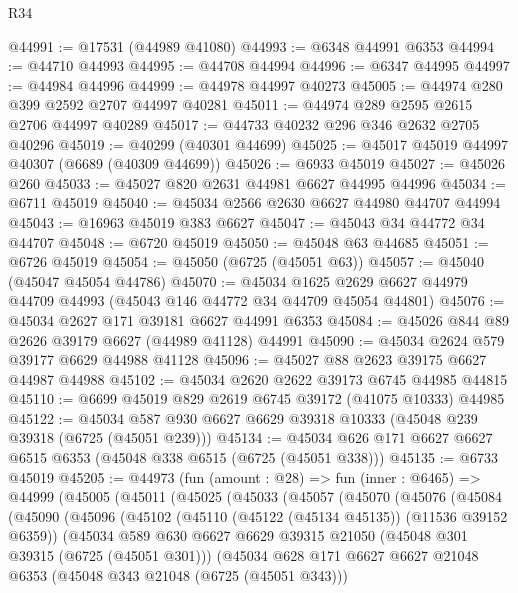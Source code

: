 \begin{lexlean}{R34}
\begin{coremodule}
@44991 := @17531 (@44989 @41080)
@44993 := @6348 @44991 @6353
@44994 := @44710 @44993
@44995 := @44708 @44994
@44996 := @6347 @44995
@44997 := @44984 @44996
@44999 := @44978 @44997 @40273
@45005 := @44974 @280 @399 @2592 @2707 @44997 @40281
@45011 := @44974 @289 @2595 @2615 @2706 @44997 @40289
@45017 := @44733 @40232 @296 @346 @2632 @2705 @40296
@45019 := @40299 (@40301 @44699)
@45025 := @45017 @45019 @44997 @40307 (@6689 (@40309 @44699))
@45026 := @6933 @45019
@45027 := @45026 @260
@45033 := @45027 @820 @2631 @44981 @6627 @44995 @44996
@45034 := @6711 @45019
@45040 := @45034 @2566 @2630 @6627 @44980 @44707 @44994
@45043 := @16963 @45019 @383 @6627
@45047 := @45043 @34 @44772 @34 @44707
@45048 := @6720 @45019
@45050 := @45048 @63 @44685
@45051 := @6726 @45019
@45054 := @45050 (@6725 (@45051 @63))
@45057 := @45040 (@45047 @45054 @44786)
@45070 := @45034
    @1625
    @2629
    @6627
    @44979
    @44709
    @44993
    (@45043 @146 @44772 @34 @44709 @45054 @44801)
@45076 := @45034 @2627 @171 @39181 @6627 @44991 @6353
@45084 := @45026 @844 @89 @2626 @39179 @6627 (@44989 @41128) @44991
@45090 := @45034 @2624 @579 @39177 @6629 @44988 @41128
@45096 := @45027 @88 @2623 @39175 @6627 @44987 @44988
@45102 := @45034 @2620 @2622 @39173 @6745 @44985 @44815
@45110 := @6699 @45019 @829 @2619 @6745 @39172 (@41075 @10333) @44985
@45122 := @45034 @587 @930 @6627 @6629 @39318 @10333 (@45048 @239 @39318 (@6725 (@45051 @239)))
@45134 := @45034 @626 @171 @6627 @6627 @6515 @6353 (@45048 @338 @6515 (@6725 (@45051 @338)))
@45135 := @6733 @45019
@45205 := @44973
    (fun (amount : @28) =>
    fun (inner : @6465) =>
    @44999
      (@45005
        (@45011
          (@45025
            (@45033
              (@45057
                (@45070
                  (@45076
                    (@45084
                      (@45090
                        (@45096
                          (@45102
                            (@45110 (@45122 (@45134 @45135)) (@11536 @39152 @6359))
                            (@45034
                              @589
                              @630
                              @6627
                              @6629
                              @39315
                              @21050
                              (@45048 @301 @39315 (@6725 (@45051 @301)))
                              (@45034
                                @628
                                @171
                                @6627
                                @6627
                                @21048
                                @6353
                                (@45048 @343 @21048 (@6725 (@45051 @343)))

\end{coremodule}
\end{lexlean}
